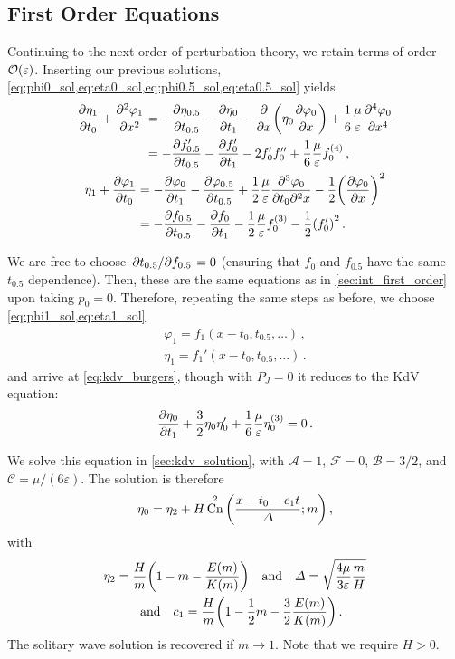 \documentclass{jfm}
\let\Oldsubsection\subsection
\renewcommand{\subsection}{\FloatBarrier\Oldsubsection}
\DeclareMathOperator{\cn}{Cn}
\renewcommand*{\epsilon}{\varepsilon}
\begin{document}
\subsection{First Order Equations}
Continuing to the next order of perturbation theory, we retain terms of
order $\order{\epsilon}$.
Inserting our previous solutions,
\cref{eq:phi0_sol,eq:eta0_sol,eq:phi0.5_sol,eq:eta0.5_sol} yields
\begin{gather}
  \begin{aligned}
    \pdv{\eta_1}{t_0} + \pdv[2]{\varphi_{1}}{x} &=
      -\pdv{\eta_{0.5}}{t_{0.5}}
      -\pdv{\eta_0}{t_1} - \pdv{x} \pqty{\eta_0 \pdv{\varphi_0}{x}} +
      \frac{1}{6} \frac{\mu}{\epsilon} \pdv[4]{\varphi_0}{x} \\
    &= -\pdv{f_{0.5}'}{t_{0.5}} -\pdv{f_0'}{t_1} - 2 f_0' f_0'' +
      \frac{1}{6} \frac{\mu}{\epsilon} f_0^{(4)} \,,
  \end{aligned}
  \\
  \begin{aligned}
    \eta_1 + \pdv{\varphi_1}{t_0} &= -\pdv{\varphi_0}{t_1}
      - \pdv{\varphi_{0.5}}{t_{0.5}}
      + \frac{1}{2} \frac{\mu}{\epsilon} \frac{\partial^3 \varphi_0}
        {\partial t_0 \partial^2 x}
      - \frac{1}{2} \pqty{ \pdv{\varphi_0}{x} }^2 \\
      &= -\pdv{f_{0.5}}{t_{0.5}} -\pdv{f_0}{t_1} - \frac{1}{2}
        \frac{\mu}{\epsilon} f_0^{(3)} -
        \frac{1}{2} \pqty{f_0'}^2 \,.
  \end{aligned}
\end{gather}

We are free to choose $\pdv*{t_{0.5}}{f_{0.5}} = 0$ (ensuring that $f_0$
and $f_{0.5}$ have the same $t_{0.5}$ dependence).
Then, these are the same equations as in \cref{sec:int_first_order} upon
taking $p_0=0$.
Therefore, repeating the same steps as before, we choose
\cref{eq:phi1_sol,eq:eta1_sol}
\begin{align}
  \varphi_1 = f_1(x-t_0,t_{0.5},\ldots) \,, \\
  \eta_1 = f_1'(x-t_0,t_{0.5},\ldots) \,.
\end{align}
and arrive at \cref{eq:kdv_burgers}, though with $P_J =0$ it reduces to
the KdV equation:
\begin{equation}
  \pdv{\eta_0}{t_1} + \frac{3}{2} \eta_0 \eta_0' + \frac{1}{6}
    \frac{\mu}{\epsilon} \eta_0^{(3)} = 0 \,.
\end{equation}

We solve this equation in \cref{sec:kdv_solution}, with $\mathcal{A} =
1$, $\mathcal{F} = 0$, $\mathcal{B} = 3/2$, and $\mathcal{C} = \mu/(6
\epsilon)$.
The solution is therefore
\begin{equation}
  \eta_0 = \eta_2 + H \cn^2\pqty{\frac{x-t_0-c_1 t}{\Delta}; m} \,,
\end{equation}
with
\begin{gather}
  \eta_2 = \frac{H}{m} \pqty{1 - m - \frac{E(m)}{K(m)}}
  \qq{and}
  \Delta = \sqrt{\frac{4 \mu}{3 \epsilon} \frac{m}{H}}
  \\
  \qq{and}
  c_1 = \frac{H}{m} \pqty{1 - \frac{1}{2} m - \frac{3}{2}
    \frac{E(m)}{K(m)}} \,.
\end{gather}
The solitary wave solution is recovered if $m \to 1$.
Note that we require $H > 0$.
\end{document}
